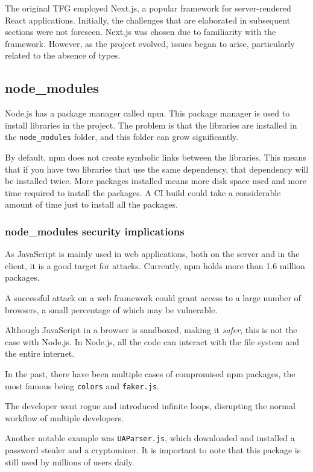 \documentclass[10pt,journal,compsoc]{IEEEtran}
\begin{document}
The original TFG \cite{TFG} employed Next.js, a popular framework for server-rendered React applications. Initially, the challenges that are elaborated in subsequent sections were not foreseen. Next.js was chosen due to familiarity with the framework. However, as the project evolved, issues began to arise, particularly related to the absence of types.

\subsection{node\_modules}

Node.js has a package manager called npm. This package manager is used to install libraries in the project. The problem is that the libraries are installed in the \verb|node_modules| folder, and this folder can grow significantly. \cite{BADNPM}

By default, npm does not create symbolic links between the libraries. This means that if you have two libraries that use the same dependency, that dependency will be installed twice. More packages installed means more disk space used and more time required to install the packages. A CI build could take a considerable amount of time just to install all the packages.

\subsubsection{node\_modules security implications}

As JavaScript is mainly used in web applications, both on the server and in the client, it is a good target for attacks. Currently, npm holds more than 1.6 million packages. \cite{NPMCOUNT}

A successful attack on a web framework could grant access to a large number of browsers, a small percentage of which may be vulnerable.

Although JavaScript in a browser is sandboxed, making it \textit{safer}, this is not the case with Node.js. In Node.js, all the code can interact with the file system and the entire internet.

In the past, there have been multiple cases of compromised npm packages, the most famous being \verb|colors| and \verb|faker.js|. \cite{BADFAKER} \cite{VERGEFAKER}

The developer went rogue and introduced infinite loops, disrupting the normal workflow of multiple developers.

Another notable example was \verb|UAParser.js|, which downloaded and installed a password stealer and a cryptominer. It is important to note that this package is still used by millions of users daily.
\end{document}
